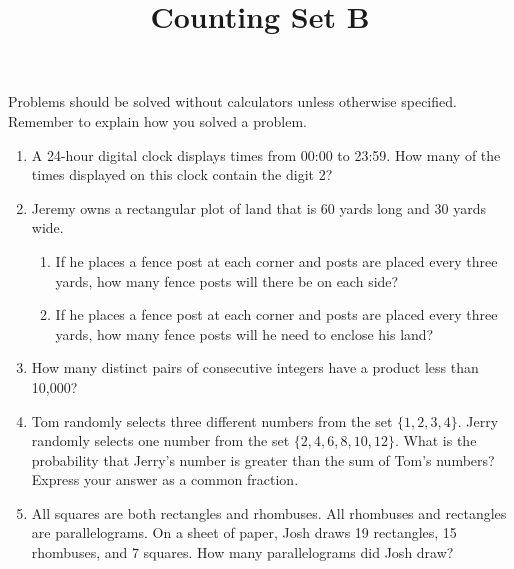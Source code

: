 \documentclass{article}
\title{Counting Set B}
\author{}
\date{}
\begin{document}
    \maketitle
    \noindent Problems should be solved without calculators unless otherwise specified.
    Remember to explain how you solved a problem.
    \begin{enumerate}
        \item A 24-hour digital clock displays times from 00:00 to 23:59. How many of the times
        displayed on this clock contain the digit 2?
        \vspace{3cm}
        \item Jeremy owns a rectangular plot of land that is 60 yards long and 30 yards wide.
        \begin{enumerate}
            \item If he places a fence post at each corner and posts are placed every three yards,
            how many fence posts will there be on each side?
            \vspace{3cm}
            \item If he places a fence post at each corner and posts are placed every three yards,
            how many fence posts will he need to enclose his land?
            \vspace{3cm}
        \end{enumerate}
        \pagebreak
        \item  How many distinct pairs of consecutive integers have a product less than 10,000?
        \vspace{3cm}
        \item Tom randomly selects three different numbers from the set $\{1, 2, 3, 4\}$.
        Jerry randomly selects one number from the set $\{2, 4, 6, 8 ,10, 12\}$. What is the
        probability that Jerry's number is greater than the sum of Tom's numbers? Express your
        answer as a common fraction.
        \vspace{3cm}
        \item All squares are both rectangles and rhombuses. All rhombuses and rectangles are
        parallelograms. On a sheet of paper, Josh draws 19 rectangles, 15 rhombuses, and 7 squares.
        How many parallelograms did Josh draw?
        \vspace{3cm}
    \end{enumerate}
\end{document}
